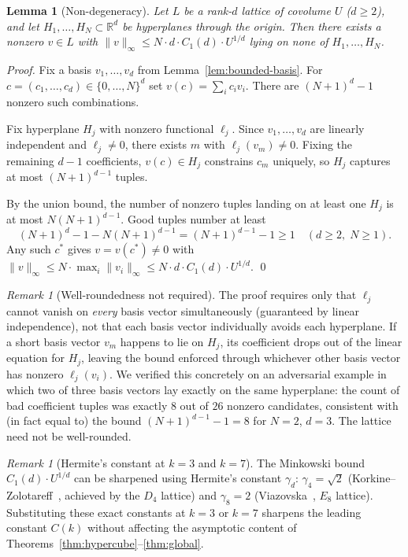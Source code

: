 \documentclass[12pt]{article}
\newtheorem{lemma}[theorem]{Lemma}
\theoremstyle{remark}
\newtheorem{remark}[theorem]{Remark}
\newcommand{\R}{\mathbb{R}}
\newcommand{\norm}[1]{\lVert #1 \rVert}
\begin{document}
\begin{lemma}[Non-degeneracy]
\label{lem:nondegen}
Let $L$ be a rank-$d$ lattice of covolume $U$ ($d \ge 2$), and let
$H_1,\ldots,H_N \subset \R^d$ be hyperplanes through the origin.  Then there
exists a nonzero $v \in L$ with $\norm{v}_\infty \le N \cdot d \cdot C_1(d)
\cdot U^{1/d}$ lying on none of $H_1,\ldots,H_N$.
\end{lemma}

\begin{proof}
Fix a basis $v_1,\ldots,v_d$ from Lemma~\ref{lem:bounded-basis}.  For $c =
(c_1,\ldots,c_d) \in \{0,\ldots,N\}^d$ set $v(c) = \sum_i c_i v_i$.  There
are $(N+1)^d - 1$ nonzero such combinations.

Fix hyperplane $H_j$ with nonzero functional $\ell_j$.  Since $v_1,\ldots,v_d$
are linearly independent and $\ell_j \ne 0$, there exists $m$ with $\ell_j(v_m)
\ne 0$.  Fixing the remaining $d-1$ coefficients, $v(c) \in H_j$ constrains
$c_m$ uniquely, so $H_j$ captures at most $(N+1)^{d-1}$ tuples.

By the union bound, the number of nonzero tuples landing on at least one $H_j$
is at most $N(N+1)^{d-1}$.  Good tuples number at least
\[
  (N+1)^d - 1 - N(N+1)^{d-1} = (N+1)^{d-1} - 1 \ge 1
  \quad (d \ge 2,\; N \ge 1).
\]
Any such $c^*$ gives $v = v(c^*) \ne 0$ with $\norm{v}_\infty \le N \cdot
\max_i \norm{v_i}_\infty \le N \cdot d \cdot C_1(d) \cdot U^{1/d}$.  \qed
\end{proof}

\begin{remark}[Well-roundedness not required]
The proof requires only that $\ell_j$ cannot vanish on \emph{every} basis vector
simultaneously (guaranteed by linear independence), not that each basis vector
individually avoids each hyperplane.  If a short basis vector $v_m$ happens to
lie on $H_j$, its coefficient drops out of the linear equation for $H_j$,
leaving the bound enforced through whichever other basis vector has nonzero
$\ell_j(v_i)$.  We verified this concretely on an adversarial example in which
two of three basis vectors lay exactly on the same hyperplane: the count of bad
coefficient tuples was exactly $8$ out of $26$ nonzero candidates, consistent
with (in fact equal to) the bound $(N+1)^{d-1} - 1 = 8$ for $N=2$, $d=3$.  The
lattice need not be well-rounded.
\end{remark}

\begin{remark}[Hermite's constant at $k=3$ and $k=7$]
The Minkowski bound $C_1(d) \cdot U^{1/d}$ can be sharpened using Hermite's
constant $\gamma_d$: $\gamma_4 = \sqrt{2}$ (Korkine--Zolotareff~\cite{kz1873},
achieved by the $D_4$ lattice) and $\gamma_8 = 2$ (Viazovska~\cite{viazovska2017},
$E_8$ lattice).  Substituting these exact constants at $k=3$ or $k=7$ sharpens
the leading constant $C(k)$ without affecting the asymptotic content of
Theorems~\ref{thm:hypercube}--\ref{thm:global}.
\end{remark}
\end{document}
